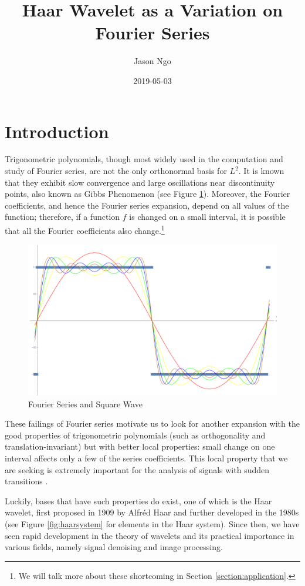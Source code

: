 \documentclass[11pt]{amsart}
\title{Haar Wavelet as a Variation on Fourier Series}
\author{Jason Ngo}
\date{2019-05-03}
\theoremstyle{theorem} %
\theoremstyle{definition}
\theoremstyle{example}
\theoremstyle{remark}
\numberwithin{equation}{section}
\begin{document}
\maketitle

\section{Introduction}
Trigonometric polynomials, though most widely used in the computation and study of Fourier series, are not the only orthonormal basis for $ L^2 $. It is known that they exhibit slow convergence and large oscillations near discontinuity points, also known as Gibbs Phenomenon (see Figure \ref{fig:squarewave}). Moreover, the Fourier coefficients, and hence the Fourier series expansion, depend on all values of the function; therefore, if a function $ f $ is changed on a small interval, it is possible that all the Fourier coefficients also change.\footnote{We will talk more about these shortcoming in Section \ref{section:application}.}

\begin{figure}[h]
	\centering
	\includegraphics[width=0.4\linewidth]{img/square_wave.png}
	\caption{Fourier Series and Square Wave \cite{weisstein}}
	\label{fig:squarewave}
\end{figure}

These failings of Fourier series motivate us to look for another expansion with the good properties of trigonometric polynomials (such as orthogonality and translation-invariant) but with better local properties: small change on one interval affects only a few of the series coefficients. This local property that we are seeking is extremely important for the analysis of signals with sudden transitions \cite{lee}.

Luckily, bases that have such properties do exist, one of which is the Haar wavelet, first proposed in 1909 by Alfréd Haar and further developed in the 1980s (see Figure \ref{fig:haarsystem} for elements in the Haar system). Since then, we have seen rapid development in the theory of wavelets and its practical importance in various fields, namely signal denoising and image processing.
\end{document}
